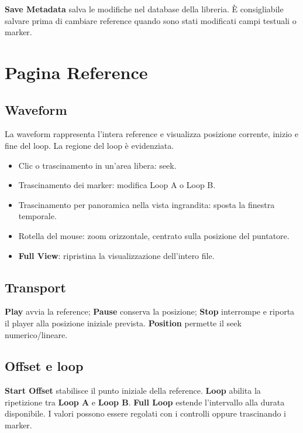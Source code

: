 \documentclass[11pt,a4paper]{article}
\newcommand{\control}[1]{\textbf{\textsf{#1}}}
\begin{document}
\control{Save Metadata} salva le modifiche nel database della libreria. È
consigliabile salvare prima di cambiare reference quando sono stati modificati
campi testuali o marker.

\section{Pagina Reference}

\subsection{Waveform}

La waveform rappresenta l'intera reference e visualizza posizione corrente,
inizio e fine del loop. La regione del loop è evidenziata.

\begin{itemize}
  \item Clic o trascinamento in un'area libera: seek.
  \item Trascinamento dei marker: modifica Loop A o Loop B.
  \item Trascinamento per panoramica nella vista ingrandita: sposta la finestra
  temporale.
  \item Rotella del mouse: zoom orizzontale, centrato sulla posizione del
  puntatore.
  \item \control{Full View}: ripristina la visualizzazione dell'intero file.
\end{itemize}

\subsection{Transport}

\control{Play} avvia la reference; \control{Pause} conserva la posizione;
\control{Stop} interrompe e riporta il player alla posizione iniziale prevista.
\control{Position} permette il seek numerico/lineare.

\subsection{Offset e loop}

\control{Start Offset} stabilisce il punto iniziale della reference.
\control{Loop} abilita la ripetizione tra \control{Loop A} e \control{Loop B}.
\control{Full Loop} estende l'intervallo alla durata disponibile. I valori
possono essere regolati con i controlli oppure trascinando i marker.
\end{document}

